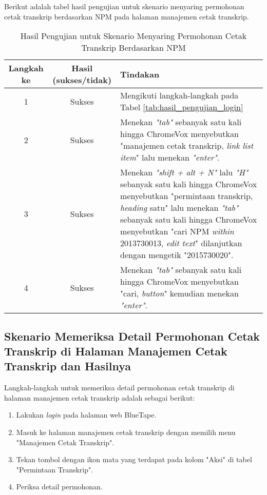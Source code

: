 Berikut adalah tabel hasil pengujian untuk skenario menyaring permohonan cetak transkrip berdasarkan NPM pada halaman manajemen cetak transkrip.

\begin{table}[H]
    \centering 
    \caption{Hasil Pengujian untuk Skenario Menyaring Permohonan Cetak Transkrip Berdasarkan NPM}
    \label{tab:hasil_pengujian_menyaring_permohonan_cetak_transkrip_berdasarkan_npm}
    \begin{tabular}{|c|c|p{10cm}|}
        \toprule
        Langkah ke & Hasil (sukses/tidak) & Tindakan \\

        \midrule
        1 & Sukses & Mengikuti langkah-langkah pada Tabel \ref{tab:hasil_pengujian_login} \\
        2 & Sukses & Menekan \textit{"tab"} sebanyak satu kali hingga ChromeVox menyebutkan "manajemen cetak transkrip, \textit{link list item}" lalu menekan \textit{"enter"}. \\
        3 & Sukses & Menekan \textit{"shift + alt + N"} lalu \textit{"H"} sebanyak satu kali hingga ChromeVox menyebutkan "permintaan transkrip, \textit{heading} satu" lalu menekan \textit{"tab"} sebanyak satu kali hingga ChromeVox menyebutkan "cari NPM \textit{within} 2013730013, \textit{edit text}" dilanjutkan dengan mengetik "2015730020". \\
        4 & Sukses & Menekan \textit{"tab"} sebanyak satu kali hingga ChromeVox menyebutkan "cari, \textit{button}" kemudian menekan \textit{"enter"}. \\

        \bottomrule

    \end{tabular}
\end{table}

\subsection{Skenario Memeriksa Detail Permohonan Cetak Transkrip di Halaman Manajemen Cetak Transkrip dan Hasilnya}
\label{subsec:skenario_memeriksa_detail_permohonan_cetak_transkrip_di_halaman_manajemen_cetak_transkrip}
Langkah-langkah untuk memeriksa detail permohonan cetak transkrip di halaman manajemen cetak transkrip adalah sebagai berikut:

\begin{enumerate}
    \item Lakukan \textit{login} pada halaman web BlueTape.
    \item Masuk ke halaman manajemen cetak transkrip dengan memilih menu "Manajemen Cetak Transkrip".
    \item Tekan tombol dengan ikon mata yang terdapat pada kolom "Aksi" di tabel "Permintaan Transkrip".
    \item Periksa detail permohonan.
\end{enumerate}

